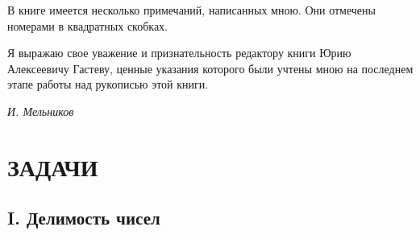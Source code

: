 \documentclass[12pt, a4paper, openany]{book}
\begin{document}
В книге имеется несколько примечаний, написанных мною. Они отмечены номерами в квадратных скобках.

Я выражаю свое уважение и признательность редактору книги Юрию Алексеевичу Гастеву, ценные указания которого были учтены мною на последнем этапе работы над рукописью этой книги.

	\begin{flushright}
	\textit{И. Мельников}
\end{flushright}
\newpage

	\section[Задачи]{\center ЗАДАЧИ}
	\subsection[I. Делимость чисел (1-43)]{\center I. Делимость чисел}
\end{document}
